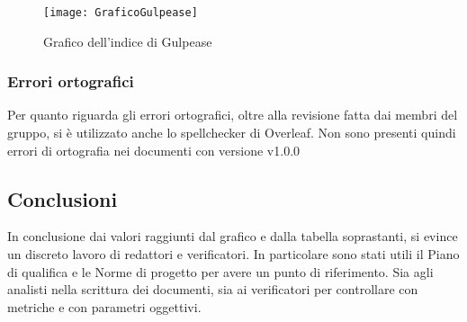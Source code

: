 \newpage
\begin{figure}[htp]
    \centering
    \texttt{[image: GraficoGulpease]}
    \caption{Grafico dell'indice di Gulpease}
    \label{fig:img-valori-gulpease}
\end{figure}


\subsubsection{Errori ortografici}

Per quanto riguarda gli errori ortografici, oltre alla revisione fatta dai membri del gruppo, si è utilizzato anche lo spellchecker di Overleaf. Non sono presenti quindi errori di ortografia nei documenti con versione v1.0.0


\subsection{Conclusioni}

In conclusione dai valori raggiunti dal grafico e dalla tabella soprastanti, si evince un discreto lavoro di redattori e verificatori.
In particolare sono stati utili il Piano di qualifica e le Norme di progetto per avere un punto di riferimento. Sia agli analisti nella scrittura dei documenti, sia ai verificatori per controllare con metriche e con parametri oggettivi.

